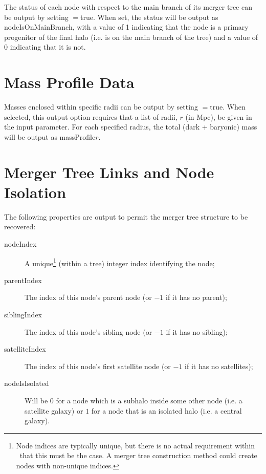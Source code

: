 The status of each node with respect to the main branch of its merger tree can be output by setting {\normalfont \ttfamily [outputMainBranchStatus]}$=${\normalfont \ttfamily true}. When set, the status will be output as {\normalfont \ttfamily nodeIsOnMainBranch}, with a value of 1 indicating that the node is a primary progenitor of the final halo (i.e. is on the main branch of the tree) and a value of 0 indicating that it is not.

\section{Mass Profile Data}

Masses enclosed within specific radii can be output by setting {\normalfont \ttfamily [outputMassProfileData]}$=${\normalfont \ttfamily true}. When selected, this output option requires that a list of radii, $r$ (in Mpc), be given in the {\normalfont \ttfamily [outputMassProfileRadii]} input parameter. For each specified radius, the total (dark + baryonic) mass will be output as {\normalfont \ttfamily massProfile}$r$.

\section{Merger Tree Links and Node Isolation}

The following properties are output to permit the merger tree structure to be recovered:
\begin{description}
 \item [{\normalfont \ttfamily nodeIndex}] A unique\footnote{Node indices are typically unique, but there is no actual requirement within \protect\glc\ that this must be the case. A merger tree construction method could create nodes with non-unique indices.} (within a tree) integer index identifying the node;
 \item [{\normalfont \ttfamily parentIndex}] The index of this node's parent node (or $-1$ if it has no parent);
 \item [{\normalfont \ttfamily siblingIndex}] The index of this node's sibling node (or $-1$ if it has no sibling);
 \item [{\normalfont \ttfamily satelliteIndex}] The index of this node's first satellite node (or $-1$ if it has no satellites);
 \item [{\normalfont \ttfamily nodeIsIsolated}] Will be $0$ for a node which is a subhalo inside some other node (i.e. a satellite galaxy) or $1$ for a node that is an isolated halo (i.e. a central galaxy).
\end{description}

